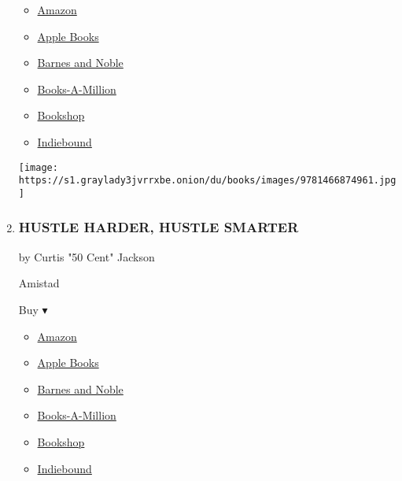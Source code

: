 \begin{enumerate}
  \begin{itemize}
  \tightlist
  \item
    \href{http://www.amazon.com/Extreme-Ownership-U-S-Navy-SEALs-ebook/dp/B00VE4Y0Z2?tag=NYTBS-20}{Amazon}
  \item
    \href{https://du-gae-books-dot-nyt-du-prd.appspot.com/buy?title=EXTREME+OWNERSHIP\&author=Jocko+Willink+and+Leif+Babin}{Apple
    Books}
  \item
    \href{https://www.anrdoezrs.net/click-7990613-11819508?url=https\%3A\%2F\%2Fwww.barnesandnoble.com\%2Fw\%2F\%3Fean\%3D9781250183866}{Barnes
    and Noble}
  \item
    \href{https://www.anrdoezrs.net/click-7990613-35140?url=https\%3A\%2F\%2Fwww.booksamillion.com\%2Fp\%2FEXTREME\%2BOWNERSHIP\%2FJocko\%2BWillink\%2Band\%2BLeif\%2BBabin\%2F9781250183866}{Books-A-Million}
  \item
    \href{https://bookshop.org/a/3546/9781250183866}{Bookshop}
  \item
    \href{https://www.indiebound.org/book/9781250183866?aff=NYT}{Indiebound}
  \end{itemize}

  \texttt{[image: https://s1.graylady3jvrrxbe.onion/du/books/images/9781466874961.jpg]}
\item
  \hypertarget{hustle-harder-hustle-smarter}{%
  \subsubsection{HUSTLE HARDER, HUSTLE
  SMARTER}\label{hustle-harder-hustle-smarter}}

  by Curtis "50 Cent" Jackson

  Amistad

  Buy ▾

  \begin{itemize}
  \tightlist
  \item
    \href{https://www.amazon.com/dp/006295380X?tag=NYTBSREV-20\&tag=NYTBS-20}{Amazon}
  \item
    \href{https://du-gae-books-dot-nyt-du-prd.appspot.com/buy?title=HUSTLE+HARDER\%2C+HUSTLE+SMARTER\&author=Curtis+\%2250+Cent\%22+Jackson}{Apple
    Books}
  \item
    \href{https://www.anrdoezrs.net/click-7990613-11819508?url=https\%3A\%2F\%2Fwww.barnesandnoble.com\%2Fw\%2F\%3Fean\%3D9780062953803}{Barnes
    and Noble}
  \item
    \href{https://www.anrdoezrs.net/click-7990613-35140?url=https\%3A\%2F\%2Fwww.booksamillion.com\%2Fp\%2FHUSTLE\%2BHARDER\%252C\%2BHUSTLE\%2BSMARTER\%2FCurtis\%2B\%252250\%2BCent\%2522\%2BJackson\%2F9780062953803}{Books-A-Million}
  \item
    \href{https://bookshop.org/a/3546/9780062953803}{Bookshop}
  \item
    \href{https://www.indiebound.org/book/9780062953803?aff=NYT}{Indiebound}
  \end{itemize}


\end{enumerate}
